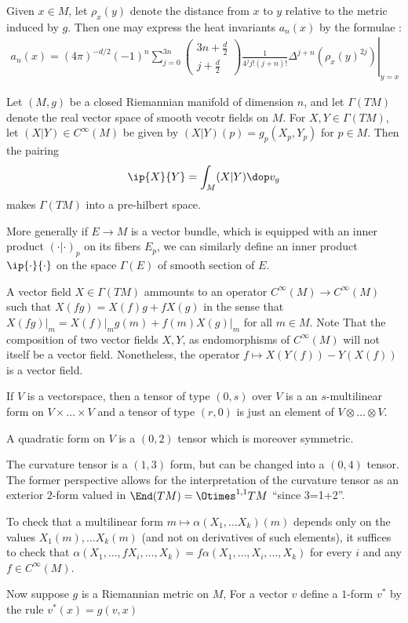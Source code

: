 Given $x\in M$, let $\rho_x(y)$ denote the distance from $x$ to $y$ relative to the metric induced by $g$.  Then one may express the heat invariants $a_n(x)$ by the formulae \cite[Theorem 1.2.1]{polterovichHeatInvariantsRiemannian2000}:
\begin{align}
    a_n(x) = \left.(4 \pi)^{-d / 2}(-1)^n \sum_{j=0}^{3 n}\left(\begin{array}{c}
                                                                        3 n+\frac{d}{2} \\
                                                                        j+\frac{d}{2}
                                                                    \end{array}\right) \frac{1}{4^j j !(j+n) !} \Delta^{j+n}\left(\rho_x(y)^{2 j}\right)\right|_{y=x}
\end{align}


\newpage

Let $(M,g)$ be a closed Riemannian manifold of dimension $n$, and let $\Gamma(TM)$ denote the real vector space of smooth vecotr fields on $M$. For $X,Y \in \Gamma(TM)$, let $(X|Y) \in C^\infty(M)$ be given by $(X|Y)(p) = g_p(X_p,Y_p)$ for $p \in M$. Then the pairing
\begin{align*}
    \ip{X}{Y} = \int_M (X|Y) \dop v_g
\end{align*}
makes $\Gamma(TM)$ into a pre-hilbert space.

More generally if $E \to M$ is a vector bundle, which is equipped with an inner product $(\cdot | \cdot)_p$ on its fibers $E_p$, we can similarly define an inner product $\ip{\cdot}{\cdot}$ on the space $\Gamma(E)$ of smooth section of $E$.

\newpage
A vector field $X \in \Gamma(TM)$ ammounts to an operator $C^\infty(M) \to C^\infty(M)$ such that $X(fg)= X(f)g+fX(g)$ in the sense that $X(fg)\vert_m = X(f)\vert_m g(m) + f(m) X(g)\vert_m$ for all $m \in M$. Note That the composition of two vector fields $X,Y$, as endomorphisms of $C^\infty(M)$ will not itself be a vector field. Nonetheless, the operator $f \mapsto X(Y(f)) - Y(X(f))$ is a vector field.

If $V$ is a vectorspace, then a tensor of type $(0,s)$ over $V$ is a an $s$-multilinear form on $V\times\dots \times V$ and a tensor of type $(r,0)$ is just an element of $V \otimes \dots \otimes V$.

A quadratic form on $V$ is a $(0,2)$ tensor which is moreover symmetric.

The curvature tensor is a $(1,3)$ form, but can be changed into a $(0,4)$ tensor. The former perspective allows for the interpretation of the curvature tensor as an exterior $2$-form valued in $\End(TM) = \Otimes^{1,1} TM$ ``since 3=1+2''.

To check that a multilinear form $m \mapsto \alpha(X_1,\dots X_k)(m)$ depends only on the values $X_1(m),\dots X_k(m)$ (and not on derivatives of such elements), it suffices to check that $\alpha(X_1 ,\dots, fX_i,\dots, X_k) = f \alpha(X_1 ,\dots, X_i,\dots, X_k)$ for every $i$ and any $f\in C^\infty(M)$.

Now suppose $g$ is a Riemannian metric on $M$, For a vector $v$ define a $1$-form $v^*$ by the rule $v^*(x)=g(v,x)$